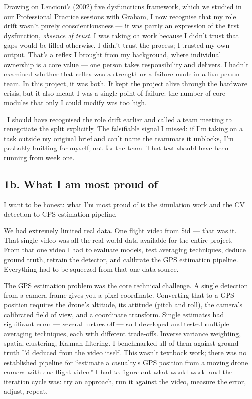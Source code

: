 Drawing on Lencioni's (2002) five dysfunctions framework, which we studied in our Professional Practice sessions with Graham, I now recognise that my role drift wasn't purely conscientiousness --- it was partly an expression of the first dysfunction, \textit{absence of trust}. I was taking on work because I didn't trust that gaps would be filled otherwise. I didn't trust the process; I trusted my own output. That's a reflex I brought from my background, where individual ownership is a core value --- one person takes responsibility and delivers. I hadn't examined whether that reflex was a strength or a failure mode in a five-person team. In this project, it was both. It kept the project alive through the hardware crisis, but it also meant I was a single point of failure: the number of core modules that only I could modify was too high.

\ebi\ I should have recognised the role drift earlier and called a team meeting to renegotiate the split explicitly. The falsifiable signal I missed: if I'm taking on a task outside my original brief and can't name the teammate it unblocks, I'm probably building for myself, not for the team. That test should have been running from week one.


\subsection{1b. What I am most proud of}

I want to be honest: what I'm most proud of is the simulation work and the CV detection-to-GPS estimation pipeline.

We had extremely limited real data. One flight video from Sid --- that was it. That single video was all the real-world data available for the entire project. From that one video I had to evaluate models, test averaging techniques, deduce ground truth, retrain the detector, and calibrate the GPS estimation pipeline. Everything had to be squeezed from that one data source.

The GPS estimation problem was the core technical challenge. A single detection from a camera frame gives you a pixel coordinate. Converting that to a GPS position requires the drone's altitude, its attitude (pitch and roll), the camera's calibrated field of view, and a coordinate transform. Single estimates had significant error --- several metres off --- so I developed and tested multiple averaging techniques, each with different trade-offs. Inverse variance weighting, spatial clustering, Kalman filtering. I benchmarked all of them against ground truth I'd deduced from the video itself. This wasn't textbook work; there was no established pipeline for ``estimate a casualty's GPS position from a moving drone camera with one flight video.'' I had to figure out what would work, and the iteration cycle was: try an approach, run it against the video, measure the error, adjust, repeat.

